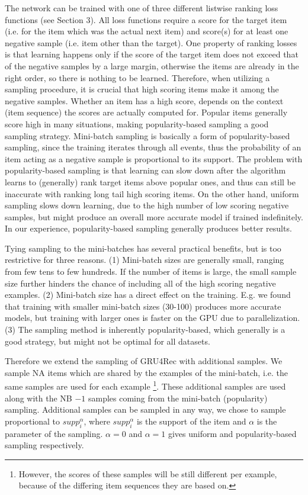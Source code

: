 The network can be trained with one of three different listwise ranking loss functions (see Section 3).
All loss functions require a score for the target item (i.e. for the item which was the actual next
item) and score(s) for at least one negative sample (i.e. item other than the target). One property
of ranking losses is that learning happens only if the score of the target item does not exceed that
of the negative samples by a large margin, otherwise the items are already in the right order, so
there is nothing to be learned. Therefore, when utilizing a sampling procedure, it is crucial that
high scoring items make it among the negative samples. Whether an item has a high score, depends
on the context (item sequence) the scores are actually computed for. Popular items generally score
high in many situations, making popularity-based sampling a good sampling strategy. Mini-batch
sampling is basically a form of popularity-based sampling, since the training iterates through all
events, thus the probability of an item acting as a negative sample is proportional to its support. The
problem with popularity-based sampling is that learning can slow down after the algorithm learns
to (generally) rank target items above popular ones, and thus can still be inaccurate with ranking
long tail high scoring items. On the other hand, uniform sampling slows down learning, due to the
high number of low scoring negative samples, but might produce an overall more accurate model if
trained indefinitely. In our experience, popularity-based sampling generally produces better results.

Tying sampling to the mini-batches has several practical benefits, but is too restrictive for three
reasons. (1) Mini-batch sizes are generally small, ranging from few tens to few hundreds. If the
number of items is large, the small sample size further hinders the chance of including all of the high
scoring negative examples. (2) Mini-batch size has a direct effect on the training. E.g. we found that training with smaller mini-batch sizes (30-100) produces more accurate models, but training
with larger ones is faster on the GPU due to parallelization. (3) The sampling method is inherently
popularity-based, which generally is a good strategy, but might not be optimal for all datasets.

Therefore we extend the sampling of GRU4Rec with additional samples. We sample NA items
which are shared by the examples of the mini-batch, i.e. the same samples are used for each example \footnote[4]{However, the scores of these samples will be still different per example, because of the differing item sequences they are based on.}. These additional samples are used along with the NB $ − 1$ samples coming from the mini-batch (popularity) sampling. Additional samples can be sampled in any way, we chose to sample proportional to $supp^\alpha_i$, where $supp^{\alpha}_{i}$ is the support of the item and $\alpha$ is the parameter of the sampling. $\alpha = 0$ and $\alpha = 1$ gives uniform and popularity-based sampling respectively.

